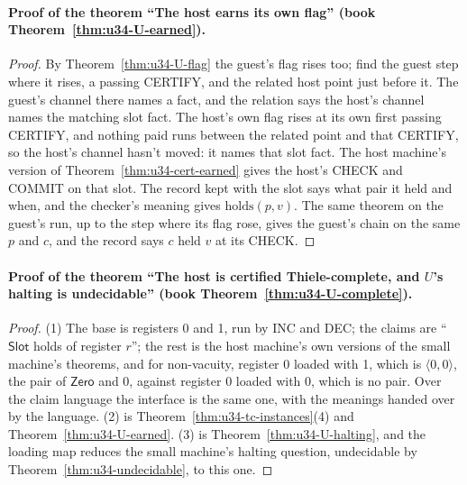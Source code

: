 \documentclass[11pt,twoside]{article}
\theoremstyle{thielethm}
\theoremstyle{thieledef}
\theoremstyle{thieledef}
\theoremstyle{thieledef}
\theoremstyle{thielethm}
\theoremstyle{thieleobs}
\theoremstyle{thielethm}
\begin{document}
\paragraph{Proof of the theorem ``The host earns its own flag'' (book Theorem~\ref{thm:u34-U-earned}).}
\begin{proof}
By Theorem~\ref{thm:u34-U-flag} the guest's flag rises too; find the guest step where it rises, a
passing CERTIFY, and the related host point just before it. The guest's channel there names a
fact, and the relation says the host's channel names the matching slot fact. The host's own flag
rises at its own first passing CERTIFY, and nothing paid runs between the related point and that
CERTIFY, so the host's channel hasn't moved: it names that slot fact. The host machine's version
of Theorem~\ref{thm:u34-cert-earned} gives the host's CHECK and COMMIT on that slot. The record kept with the slot
says what pair it held and when, and the checker's meaning gives $\mathrm{holds}(p, v)$. The same
theorem on the guest's run, up to the step where its flag rose, gives the guest's chain on the
same $p$ and $c$, and the record says $c$ held $v$ at its CHECK.
\end{proof}

\paragraph{Proof of the theorem ``The host is certified Thiele-complete, and $U$'s halting is undecidable'' (book Theorem~\ref{thm:u34-U-complete}).}
\begin{proof}
(1) The base is registers 0 and 1, run by INC and DEC; the claims are ``$\mathsf{Slot}$ holds of
register $r$''; the rest is the host machine's own versions of the small machine's theorems, and
for non-vacuity, register 0 loaded with 1, which is $\langle 0, 0\rangle$, the pair of
$\mathsf{Zero}$ and 0, against register 0 loaded with 0, which is no pair. Over the claim
language the interface is the same one, with the meanings handed over by the language. (2) is
Theorem~\ref{thm:u34-tc-instances}(4) and Theorem~\ref{thm:u34-U-earned}. (3) is
Theorem~\ref{thm:u34-U-halting}, and the loading map reduces the small machine's halting question,
undecidable by Theorem~\ref{thm:u34-undecidable}, to this one.
\end{proof}
\end{document}
